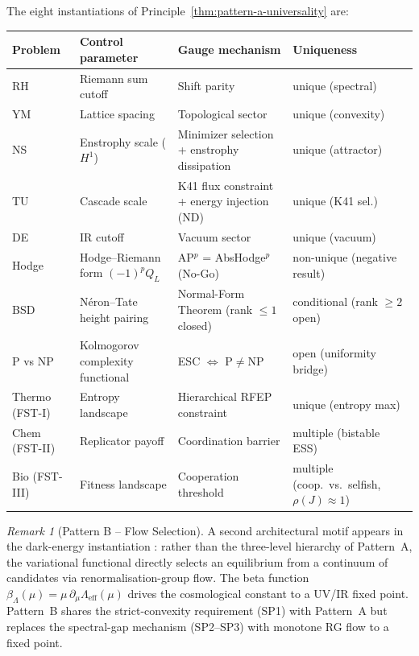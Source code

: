 \documentclass[12pt,a4paper]{article}
\theoremstyle{definition}
\theoremstyle{remark}
\newtheorem{remark}[theorem]{Remark}
\begin{document}
The eight instantiations of Principle~\ref{thm:pattern-a-universality} are:

\medskip
\begin{center}
\small
\begin{tabular}{p{2.2cm}p{3.0cm}p{5.0cm}p{4.0cm}}
\hline
\textbf{Problem} & \textbf{Control parameter} & \textbf{Gauge mechanism} & \textbf{Uniqueness} \\
\hline
RH    & Riemann sum cutoff          & Shift parity                                    & unique (spectral) \\
YM    & Lattice spacing             & Topological sector                              & unique (convexity) \\
NS    & Enstrophy scale ($H^1$)     & Minimizer selection + enstrophy dissipation      & unique (attractor) \\
TU    & Cascade scale               & K41 flux constraint + energy injection (ND)      & unique (K41 sel.) \\
DE    & IR cutoff                   & Vacuum sector                                   & unique (vacuum) \\
Hodge & Hodge--Riemann form $(-1)^p Q_L$ & AP$^p$ = AbsHodge$^p$ (No-Go)             & non-unique (negative result) \cite{Geiger2026-Hodge} \\
BSD   & N\'eron--Tate height pairing & Normal-Form Theorem (rank $\leq 1$ closed)     & conditional (rank $\geq 2$ open) \cite{Geiger2026-BSD} \\
P vs NP & Kolmogorov complexity functional & ESC $\Leftrightarrow$ P$\neq$NP          & open (uniformity bridge) \cite{Geiger2026-PvsNP} \\
Thermo (FST-I)  & Entropy landscape   & Hierarchical RFEP constraint                    & unique (entropy max) \\
Chem (FST-II)   & Replicator payoff   & Coordination barrier                            & multiple (bistable ESS) \\
Bio (FST-III)   & Fitness landscape   & Cooperation threshold                           & multiple (coop.\ vs.\ selfish, $\rho(J)\!\approx\!1$) \\
\hline
\end{tabular}
\normalsize
\end{center}

\begin{remark}[Pattern B -- Flow Selection]\label{rem:pattern-b}
A second architectural motif appears in the dark-energy instantiation \cite{Geiger2026-DE}: rather than the three-level hierarchy of Pattern~A, the variational functional directly selects an equilibrium from a continuum of candidates via renormalisation-group flow. The beta function $\beta_\Lambda(\mu) = \mu\,\partial_\mu \Lambda_{\mathrm{eff}}(\mu)$ drives the cosmological constant to a UV/IR fixed point. Pattern~B shares the strict-convexity requirement (SP1) with Pattern~A but replaces the spectral-gap mechanism (SP2--SP3) with monotone RG flow to a fixed point.
\end{remark}
\end{document}
